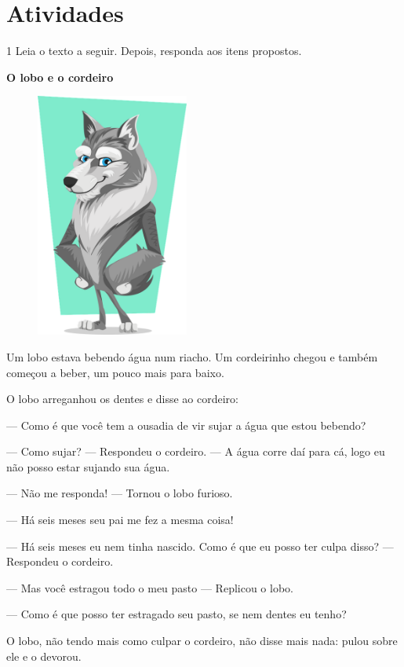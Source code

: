 \section*{Atividades}

\num{1} Leia o texto a seguir. Depois, responda aos itens propostos.


\begin{myquote}
\textbf{O lobo e o cordeiro}

\begin{figure}
\includegraphics[width=1.97917in,height=3.16667in]{./media/image5.png}
\end{figure}

Um lobo estava bebendo água num riacho. Um cordeirinho chegou e também
começou a beber, um pouco mais para baixo.

O lobo arreganhou os dentes e disse ao cordeiro:

--- Como é que você tem a ousadia de vir sujar a água que estou bebendo?

--- Como sujar? --- Respondeu o cordeiro. --- A água corre daí para cá,
logo eu não posso estar sujando sua água.

--- Não me responda! --- Tornou o lobo furioso.

--- Há seis meses seu pai me fez a mesma coisa!

--- Há seis meses eu nem tinha nascido. Como é que eu posso ter culpa
disso? --- Respondeu o cordeiro.

--- Mas você estragou todo o meu pasto --- Replicou o lobo.

--- Como é que posso ter estragado seu pasto, se nem dentes eu tenho?

O lobo, não tendo mais como culpar o cordeiro, não disse mais nada:
pulou sobre ele e o devorou.

\end{myquote}

